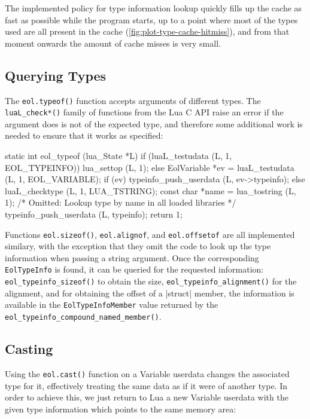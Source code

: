 The implemented policy for type information lookup quickly fills up the cache
as fast as possible while the program starts, up to a point where most of the
types used are all present in the cache
(\autoref{fig:plot-type-cache-hitmiss}), and from that moment onwards the
amount of cache misses is very small. 


\subsection{Querying Types}

The \verb|eol.typeof()| function accepts arguments of different types.
The \verb|luaL_check*()| family of functions from the Lua C API raise an error
if the argument does is not of the expected type, and therefore some
additional work is needed to ensure that it works as specified:

\begin{ccode}
static int
eol_typeof (lua_State *L) {
  if (luaL_testudata (L, 1, EOL_TYPEINFO)) {
    lua_settop (L, 1);
  } else {
    EolVariable *ev = luaL_testudata (L, 1, EOL_VARIABLE);
    if (ev) {
      typeinfo_push_userdata (L, ev->typeinfo);
    } else {
      luaL_checktype (L, 1, LUA_TSTRING);
      const char *name = lua_tostring (L, 1);
      /* Omitted: Lookup type by name in all loaded libraries */
      typeinfo_push_userdata (L, typeinfo);
    }
  }
  return 1;
}
\end{ccode}

Functions \verb|eol.sizeof()|, \verb|eol.alignof|, and \verb|eol.offsetof| are
all implemented similary, with the exception that they omit the code to look
up the type information when passing a string argument. Once the corresponding
\verb|EolTypeInfo| is found, it can be queried for the requested information:
\verb|eol_typeinfo_sizeof()| to obtain the size,
\verb|eol_typeinfo_alignment()| for the alignment, and for obtaining the offset
of a \Mc|struct| member, the information is available in the
\verb|EolTypeInfoMember| value returned by the
\verb|eol_typeinfo_compound_named_member()|.

\subsection{Casting}

Using the \verb|eol.cast()| function on a \textsf{Variable} userdata changes
the associated type for it, effectively treating the same data as if it were
of another type. In order to achieve this, we just return to Lua a new
\textsf{Variable} userdata with the given type information which points to
the same memory area:

